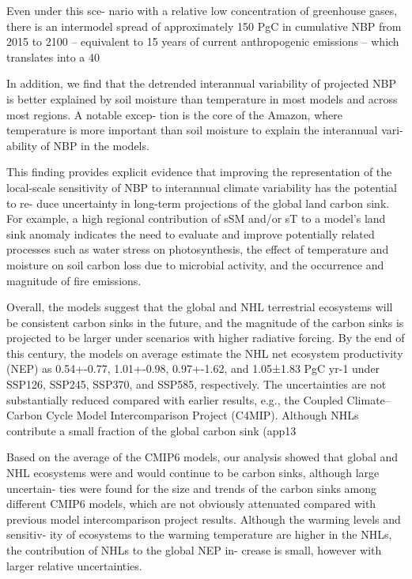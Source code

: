 \documentclass{article}
\begin{document}
Even under this sce- nario with a relative low concentration of greenhouse gases, there is an intermodel spread of approximately 150 PgC in cumulative NBP from 2015 to 2100 – equivalent to 15 years of current anthropogenic emissions – which translates into a 40%

In addition, we find that the detrended interannual variability of projected NBP is better explained by soil moisture than temperature in most models and across most regions. A notable excep- tion is the core of the Amazon, where temperature is more important than soil moisture to explain the interannual vari- ability of NBP in the models.

This finding provides explicit evidence that improving the representation of the local-scale sensitivity of NBP to interannual climate variability has the potential to re- duce uncertainty in long-term projections of the global land carbon sink. For example, a high regional contribution of sSM and/or sT to a model’s land sink anomaly indicates the need to evaluate and improve potentially related processes such as water stress on photosynthesis, the effect of temperature and moisture on soil carbon loss due to microbial activity, and the occurrence and magnitude of fire emissions.

\citep{Qiu2023}
Overall, the models suggest that the global and NHL terrestrial ecosystems will be consistent carbon sinks in the future, and the magnitude of the carbon sinks is projected to be larger under scenarios with higher radiative forcing. By the end of this century, the models on average estimate the NHL net ecosystem productivity (NEP) as 0.54+-0.77, 1.01+-0.98, 0.97+-1.62, and 1.05±1.83 PgC yr-1 under SSP126, SSP245, SSP370, and SSP585, respectively. The uncertainties are not substantially reduced compared with earlier results, e.g., the Coupled Climate–Carbon Cycle Model Intercomparison Project (C4MIP). Although NHLs contribute a small fraction of the global carbon sink (app13 %

Based on the average of the CMIP6 models, our analysis showed that global and NHL ecosystems were and would continue to be carbon sinks, although large uncertain- ties were found for the size and trends of the carbon sinks among different CMIP6 models, which are not obviously attenuated compared with previous model intercomparison project results. Although the warming levels and sensitiv- ity of ecosystems to the warming temperature are higher in the NHLs, the contribution of NHLs to the global NEP in- crease is small, however with larger relative uncertainties.
\end{document}
